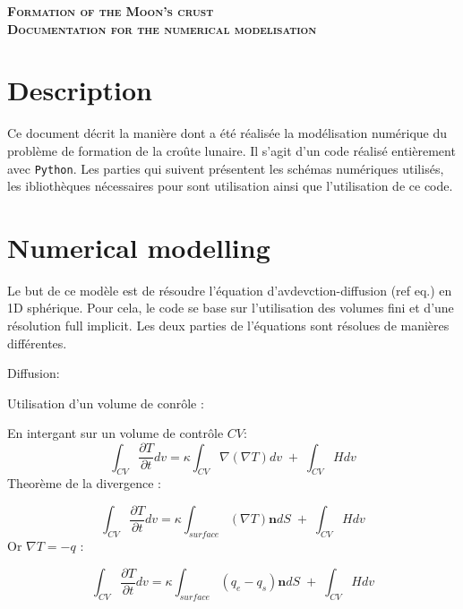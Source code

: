 \documentclass[legalpaper,12pt]{article}
\title{}
\author{Colin Line}
\date{}
\begin{document}
	
	\begin{center}
		\textsc{\LARGE \textbf{{Formation of the Moon's crust}}}\\[1cm]
		\textsc{\Large \textbf{Documentation for the numerical modelisation}}\\[1cm]
	\end{center}
	\noindent\hrulefill
	\newline
	\newline
	
	\section*{Description}
	\noindent\hrulefill
	
	Ce document décrit la manière dont a été réalisée la modélisation numérique du problème de formation de la croûte lunaire. Il s'agit d'un code réalisé entièrement avec \verb*|Python|. Les parties qui suivent présentent les schémas numériques utilisés, les ibliothèques nécessaires pour sont utilisation ainsi que l'utilisation de ce code.
	
	\section*{Numerical modelling}
    \noindent\hrulefill
    
	Le but de ce modèle est de résoudre l'équation d'avdevction-diffusion (ref eq.) en 1D sphérique. Pour cela, le code se base sur l'utilisation des volumes fini et d'une résolution full implicit. Les deux parties de l'équations sont résolues de manières différentes. 
	
	Diffusion: \newline
	
	Utilisation d'un volume de conrôle : 
	
	En intergant sur un volume de contrôle  $CV$: 
	\begin{equation}
		\int_{CV} \dfrac{\partial T}{\partial t}  dv = \kappa \int_{CV} \nabla (\nabla T) dv \;+ \;\int_{CV} H dv
	\end{equation}
	Theorème de la divergence :
	
	\begin{equation}
		\int_{CV} \dfrac{\partial T}{\partial t}  dv = \kappa \int_{surface}  (\nabla T) \mathbf{n} dS \;+ \;\int_{CV} H dv
	\end{equation}
	Or $\nabla T = -q$ :
	
	\begin{equation}
		\int_{CV} \dfrac{\partial T}{\partial t}  dv = \kappa \int_{surface}  (q_{e} - q_{s} )\mathbf{n} dS \;+ \;\int_{CV} H dv
	\end{equation}
	\\[1cm]
	
\end{document}
